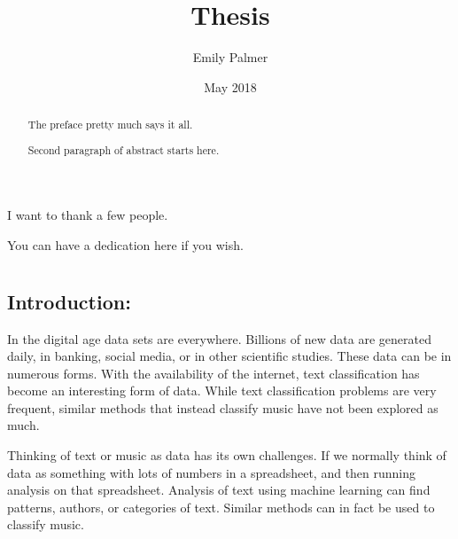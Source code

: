 \documentclass[12pt,twoside]{reedthesis}
\title{Thesis}
\author{Emily Palmer}
\date{May 2018}
\theoremstyle{definition}
\theoremstyle{definition}
\theoremstyle{definition}
\theoremstyle{remark}
\begin{document}
  \maketitle

\frontmatter %
\pagestyle{empty} %
  \begin{acknowledgements}
    I want to thank a few people.
  \end{acknowledgements}

  \hypersetup{linkcolor=black}
  \setcounter{tocdepth}{2}
  \tableofcontents

  \listoftables

  \listoffigures
  \begin{abstract}
    The preface pretty much says it all. \par
    
    Second paragraph of abstract starts here.
  \end{abstract}
  \begin{dedication}
    You can have a dedication here if you wish.
  \end{dedication}
\mainmatter %
\pagestyle{fancyplain} %

\chapter{}\label{section}

\section{Introduction:}\label{introduction}

In the digital age data sets are everywhere. Billions of new data are
generated daily, in banking, social media, or in other scientific
studies. These data can be in numerous forms. With the availability of
the internet, text classification has become an interesting form of
data. While text classification problems are very frequent, similar
methods that instead classify music have not been explored as much.

Thinking of text or music as data has its own challenges. If we normally
think of data as something with lots of numbers in a spreadsheet, and
then running analysis on that spreadsheet. Analysis of text using
machine learning can find patterns, authors, or categories of text.
Similar methods can in fact be used to classify music.
\end{document}
